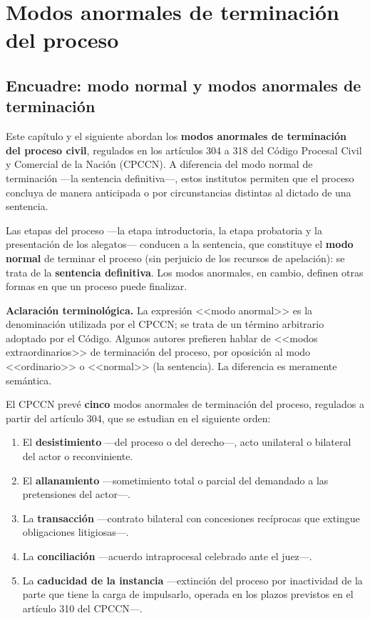 \documentclass[12pt,oneside]{book}
\begin{document}
\chapter[Modos anormales de terminación]{Modos anormales de terminación del proceso}\label{cap:modos}

\section{Encuadre: modo normal y modos anormales de terminación}

Este capítulo y el siguiente abordan los \textbf{modos anormales de terminación del proceso civil}, regulados en los artículos 304 a 318 del Código Procesal Civil y Comercial de la Nación (CPCCN). A diferencia del modo normal de terminación ---la sentencia definitiva---, estos institutos permiten que el proceso concluya de manera anticipada o por circunstancias distintas al dictado de una sentencia.

Las etapas del proceso ---la etapa introductoria, la etapa probatoria y la presentación de los alegatos--- conducen a la sentencia, que constituye el \textbf{modo normal} de terminar el proceso (sin perjuicio de los recursos de apelación): se trata de la \textbf{sentencia definitiva}. Los modos anormales, en cambio, definen otras formas en que un proceso puede finalizar.

\begin{note}
\textbf{Aclaración terminológica.} La expresión <<modo anormal>> es la denominación utilizada por el CPCCN; se trata de un término arbitrario adoptado por el Código. Algunos autores prefieren hablar de <<modos extraordinarios>> de terminación del proceso, por oposición al modo <<ordinario>> o <<normal>> (la sentencia). La diferencia es meramente semántica.
\end{note}

El CPCCN prevé \textbf{cinco} modos anormales de terminación del proceso, regulados a partir del artículo 304, que se estudian en el siguiente orden:

\begin{enumerate}
    \item El \textbf{desistimiento} ---del proceso o del derecho---, acto unilateral o bilateral del actor o reconviniente.
    \item El \textbf{allanamiento} ---sometimiento total o parcial del demandado a las pretensiones del actor---.
    \item La \textbf{transacción} ---contrato bilateral con concesiones recíprocas que extingue obligaciones litigiosas---.
    \item La \textbf{conciliación} ---acuerdo intraprocesal celebrado ante el juez---.
    \item La \textbf{caducidad de la instancia} ---extinción del proceso por inactividad de la parte que tiene la carga de impulsarlo, operada en los plazos previstos en el artículo 310 del CPCCN---.
\end{enumerate}
\end{document}
